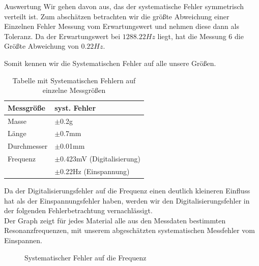 \documentclass[twoside]{protokoll}
\begin{document}
\begin{aufgabe}{Auswertung}
Wir gehen davon aus, das der systematische Fehler symmetrisch verteilt ist.
Zum abschätzen betrachten wir die größte Abweichung einer Einzelnen Fehler Messung vom Erwartungswert und nehmen diese dann als Toleranz.
Da der Erwartungswert bei $1288.22 Hz$ liegt, hat die Messung 6 die Größte Abweichung von $0.22 Hz$.

Somit kennen wir die Systematischen Fehler auf alle unsere Größen.\\
 

\begin{table}[H]
    \centering
    \begin{tabularx}{0.8\textwidth}{X l} %
        \toprule
        \textbf{Messgröße} & \textbf{syst. Fehler} \\
        \midrule
        Masse & $\pm$0.2g \\
        Länge & $\pm$0.7mm\\
        Durchmesser & $\pm$0.01mm \\
        Frequenz & $\pm$0.423mV (Digitalisierung)\\
        & $\pm$0.22Hz (Einspannung) \\
        \bottomrule
    \end{tabularx}
    \caption{Tabelle mit Systematischen Fehlern auf einzelne Messgrößen}
    \label{tab:mytable}
\end{table}

Da der Digitalisierungsfehler auf die Frequenz einen deutlich kleineren Einfluss hat als der Einspannungsfehler haben, werden wir den Digitalisierungsfehler in der folgenden Fehlerbetrachtung vernachlässigt. \\
Der Graph zeigt für jedes Material alle aus den Messdaten bestimmten Resonanzfrequenzen, mit unserem abgeschätzten systematischen Messfehler vom Einspannen.

\begin{figure}[H]
  \centering
    \caption{Systematischer Fehler auf die Frequenz}
  \hfill
\end{figure}
\begin{figure}[H]
  \centering
  \hfill
\end{figure}


\end{aufgabe}
\end{document}
